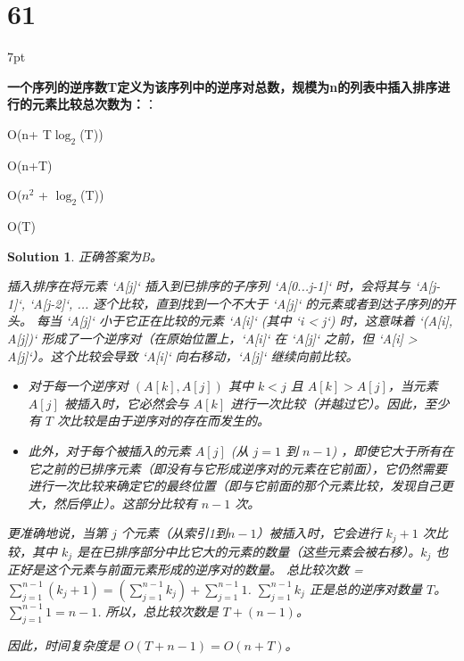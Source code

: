 \documentclass[UTF8]{report}
\newtheorem{solution}{Solution}
\theoremstyle{MyLineTheoremStyle} %
\theoremstyle{MyBlockTheoremStyle} %
\theoremstyle{MySubsubsectionStyle} %
\newenvironment{graybox}{%
        \def\FrameCommand{%
        \hspace{1pt}%
        {\color{gray}\small \vrule width 2pt}%
        {\color{graybox_color}\vrule width 4pt}%
        \colorbox{graybox_color}%
        }%
        \MakeFramed{\advance\hsize-\width\FrameRestore}%
        \noindent\hspace{-4.55pt}%
        \begin{adjustwidth}{}{7pt}%
        \vspace{2pt}\vspace{2pt}%
        }
        {%
        \vspace{2pt}\end{adjustwidth}\endMakeFramed%
        }
\begin{document}
\section*{61}

\begin{graybox}
\textbf{一个序列的逆序数T定义为该序列中的逆序对总数，规模为n的列表中插入排序进行的元素比较总次数为：}：
\begin{circledenum}
    \item O(n+ T$\log_2$(T))
    \item O(n+T)
    \item O($n^2$ + $\log_2$(T))
    \item O(T)
\end{circledenum}
\end{graybox}

\begin{solution}
正确答案为B。

插入排序在将元素 `A[j]` 插入到已排序的子序列 `A[0...j-1]` 时，会将其与 `A[j-1]`, `A[j-2]`, ... 逐个比较，直到找到一个不大于 `A[j]` 的元素或者到达子序列的开头。
每当 `A[j]` 小于它正在比较的元素 `A[i]` (其中 `i < j`) 时，这意味着 `(A[i], A[j])` 形成了一个逆序对（在原始位置上，`A[i]` 在 `A[j]` 之前，但 `A[i] > A[j]`）。这个比较会导致 `A[i]` 向右移动，`A[j]` 继续向前比较。

\begin{itemize}
    \item 对于每一个逆序对 $(A[k], A[j])$ 其中 $k < j$ 且 $A[k] > A[j]$，当元素 $A[j]$ 被插入时，它必然会与 $A[k]$ 进行一次比较（并越过它）。因此，至少有 $T$ 次比较是由于逆序对的存在而发生的。
    \item 此外，对于每个被插入的元素 $A[j]$ (从 $j=1$ 到 $n-1$) ，即使它大于所有在它之前的已排序元素（即没有与它形成逆序对的元素在它前面），它仍然需要进行一次比较来确定它的最终位置（即与它前面的那个元素比较，发现自己更大，然后停止）。这部分比较有 $n-1$ 次。
\end{itemize}

更准确地说，当第 $j$ 个元素（从索引1到$n-1$）被插入时，它会进行 $k_j + 1$ 次比较，其中 $k_j$ 是在已排序部分中比它大的元素的数量（这些元素会被右移）。$k_j$ 也正好是这个元素与前面元素形成的逆序对的数量。
总比较次数 = $\sum_{j=1}^{n-1} (k_j + 1) = (\sum_{j=1}^{n-1} k_j) + \sum_{j=1}^{n-1} 1$.
$\sum_{j=1}^{n-1} k_j$ 正是总的逆序对数量 $T$。
$\sum_{j=1}^{n-1} 1 = n-1$.
所以，总比较次数是 $T + (n-1)$。

因此，时间复杂度是 $O(T + n-1) = O(n+T)$。
\end{solution}
\end{document}
